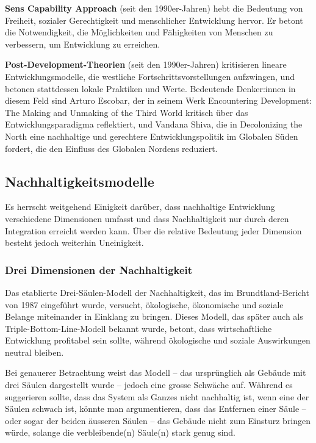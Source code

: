 \documentclass[
  letterpaper,
  DIV=11,
  numbers=noendperiod]{scrartcl}
\begin{document}
\begin{tcolorbox}
\textbf{Sens Capability Approach} (seit den 1990er-Jahren) hebt die
Bedeutung von Freiheit, sozialer Gerechtigkeit und menschlicher
Entwicklung hervor. Er betont die Notwendigkeit, die Möglichkeiten und
Fähigkeiten von Menschen zu verbessern, um Entwicklung zu erreichen.

\textbf{Post-Development-Theorien} (seit den 1990er-Jahren) kritisieren
lineare Entwicklungsmodelle, die westliche Fortschrittsvorstellungen
aufzwingen, und betonen stattdessen lokale Praktiken und Werte.
Bedeutende Denker:innen in diesem Feld sind Arturo Escobar, der in
seinem Werk Encountering Development: The Making and Unmaking of the
Third World kritisch über das Entwicklungsparadigma reflektiert, und
Vandana Shiva, die in Decolonizing the North eine nachhaltige und
gerechtere Entwicklungspolitik im Globalen Süden fordert, die den
Einfluss des Globalen Nordens reduziert.

\end{tcolorbox}

\subsection{Nachhaltigkeitsmodelle}\label{nachhaltigkeitsmodelle}

Es herrscht weitgehend Einigkeit darüber, dass nachhaltige Entwicklung
verschiedene Dimensionen umfasst und dass Nachhaltigkeit nur durch deren
Integration erreicht werden kann. Über die relative Bedeutung jeder
Dimension besteht jedoch weiterhin Uneinigkeit.

\subsubsection{Drei Dimensionen der
Nachhaltigkeit}\label{drei-dimensionen-der-nachhaltigkeit}

Das etablierte Drei-Säulen-Modell der Nachhaltigkeit, das im
Brundtland-Bericht von 1987 eingeführt wurde, versucht, ökologische,
ökonomische und soziale Belange miteinander in Einklang zu bringen.
Dieses Modell, das später auch als Triple-Bottom-Line-Modell bekannt
wurde, betont, dass wirtschaftliche Entwicklung profitabel sein sollte,
während ökologische und soziale Auswirkungen neutral bleiben.

Bei genauerer Betrachtung weist das Modell -- das ursprünglich als
Gebäude mit drei Säulen dargestellt wurde -- jedoch eine grosse Schwäche
auf. Während es suggerieren sollte, dass das System als Ganzes nicht
nachhaltig ist, wenn eine der Säulen schwach ist, könnte man
argumentieren, dass das Entfernen einer Säule -- oder sogar der beiden
äusseren Säulen -- das Gebäude nicht zum Einsturz bringen würde, solange
die verbleibende(n) Säule(n) stark genug sind.
\end{document}
